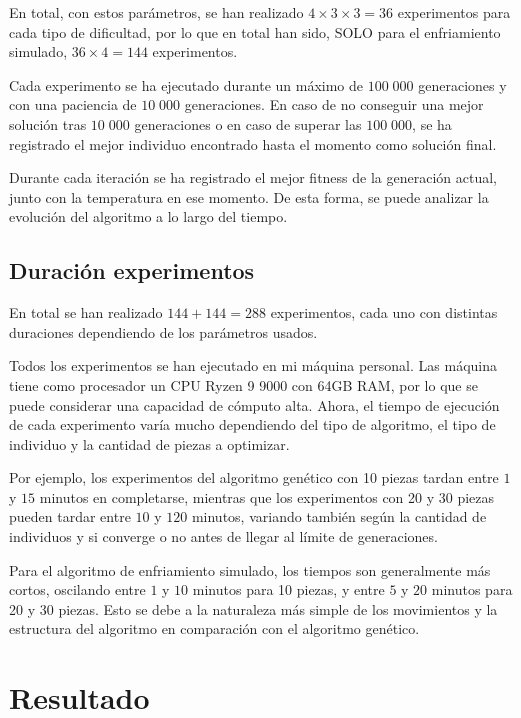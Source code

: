 \documentclass[11pt,spanish,listoffigures,listoftables]{tfgetsinf}
\begin{document}
En total, con estos parámetros, se han realizado $4 \times 3 \times 3 = 36$ experimentos para cada tipo de dificultad, por lo que en total han sido, SOLO para el enfriamiento simulado, $36 \times 4 = 144$ experimentos.

Cada experimento se ha ejecutado durante un máximo de $100\;000$ generaciones y con una paciencia de $10\;000$ generaciones. En caso de no conseguir una mejor solución tras $10\;000$ generaciones o en caso de superar las $100\;000$, se ha registrado el mejor individuo encontrado hasta el momento como solución final.

Durante cada iteración se ha registrado el mejor fitness de la generación actual, junto con la temperatura en ese momento. De esta forma, se puede analizar la evolución del algoritmo a lo largo del tiempo.

\section{Duración experimentos}
En total se han realizado $144 + 144 = 288$ experimentos, cada uno con distintas duraciones dependiendo de los parámetros usados.

Todos los experimentos se han ejecutado en mi máquina personal. Las máquina tiene como procesador un CPU Ryzen 9 9000 con 64GB RAM, por lo que se puede considerar una capacidad de cómputo alta. Ahora, el tiempo de ejecución de cada experimento varía mucho dependiendo del tipo de algoritmo, el tipo de individuo y la cantidad de piezas a optimizar. 

Por ejemplo, los experimentos del algoritmo genético con 10 piezas tardan entre $1$ y $15$ minutos en completarse, mientras que los experimentos con 20 y 30 piezas pueden tardar entre $10$ y $120$ minutos, variando también según la cantidad de individuos y si converge o no antes de llegar al límite de generaciones.

Para el algoritmo de enfriamiento simulado, los tiempos son generalmente más cortos, oscilando entre $1$ y $10$ minutos para 10 piezas, y entre $5$ y $20$ minutos para 20 y 30 piezas. Esto se debe a la naturaleza más simple de los movimientos y la estructura del algoritmo en comparación con el algoritmo genético.

\chapter{Resultado}
\end{document}
